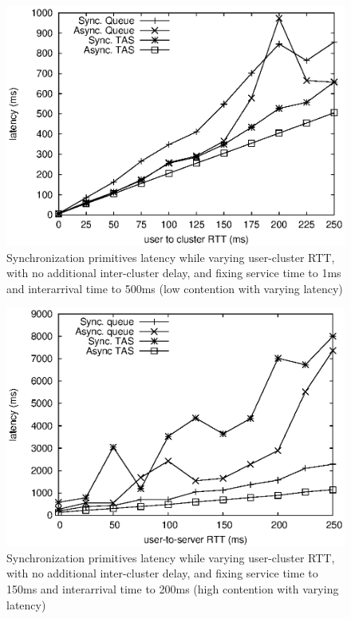 \begin{figure}[ht]
\centering
\includegraphics[scale=0.68]{img/primitives_fixClusterLatency-0.eps}
\caption{Synchronization primitives latency while varying user-cluster RTT, with no additional inter-cluster delay, and fixing service time to 1ms and interarrival time to 500ms (low contention with varying latency)}
\label{fig:primitives_vary_delay_lowcontention}
\end{figure}

\begin{figure}[ht]
\centering
\includegraphics[scale=0.68]{img/fixService-150_varyLatency.eps}
\caption{Synchronization primitives latency while varying user-cluster RTT, with no additional inter-cluster delay, and fixing service time to 150ms and interarrival time to 200ms (high contention with varying latency)}
\label{fig:primitives_vary_delay_highcontention}
\end{figure}

